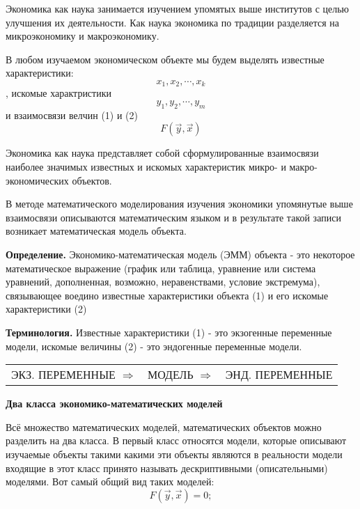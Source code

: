 \documentclass[12pt,a4paper]{article}
\begin{document}
Экономика как наука занимается изучением упомятых выше институтов с целью улучшения их деятельности. Как наука экономика по традиции разделяется на микроэкономику и макроэкономику.

В любом изучаемом экономическом объекте мы будем выделять известные характеристики:
\begin{equation}
x_1, x_2, \cdots, x_k
\end{equation}
, искомые характристики 
\begin{equation}
y_1, y_2, \cdots, y_m
\end{equation}
и взаимосвязи велчин (1) и (2)
\begin{equation}
 F(\vec{y}, \vec{x})
 \end{equation}

Экономика как наука представляет собой сформулированные взаимосвязи наиболее значимых известных и искомых характеристик микро- и макро- экономических объектов.

В методе математического моделирования изучения экономики упомянутые выше взаимосвязи описываются математическим языком и в результате такой записи возникает математическая модель объекта. 

\textbf{Определение.} Экономико-математическая модель (ЭММ) объекта - это некоторое математическое выражение (график или таблица, уравнение или система уравнений, дополненная, возможно, неравенствами, условие экстремума), связывающее воедино известные характеристики объекта (1) и его искомые характеристики (2)

\textbf{Терминология.} Известные характеристики (1) - это экзогенные переменные модели, искомые величины (2) - это эндогенные переменные модели.
\begin{center}
\begin{tabular}{ccc}
ЭКЗ. ПЕРЕМЕННЫЕ  $\Rightarrow$ &МОДЕЛЬ $\Rightarrow$ &ЭНД. ПЕРЕМЕННЫЕ 
\end{tabular}
\end{center}

\begin{center}
\textbf{Два класса экономико-математических моделей}
\end{center}

Всё множество математических моделей, математических объектов можно разделить на два класса. В первый класс относятся модели, которые описывают изучаемые объекты такими какими эти объекты являются в реальности модели входящие в этот класс принято называть дескриптивными (описательными) моделями. Вот самый общий вид таких моделей:
\begin{equation}
F(\vec{y}, \vec{x}) = 0;
\end{equation}
\end{document}
